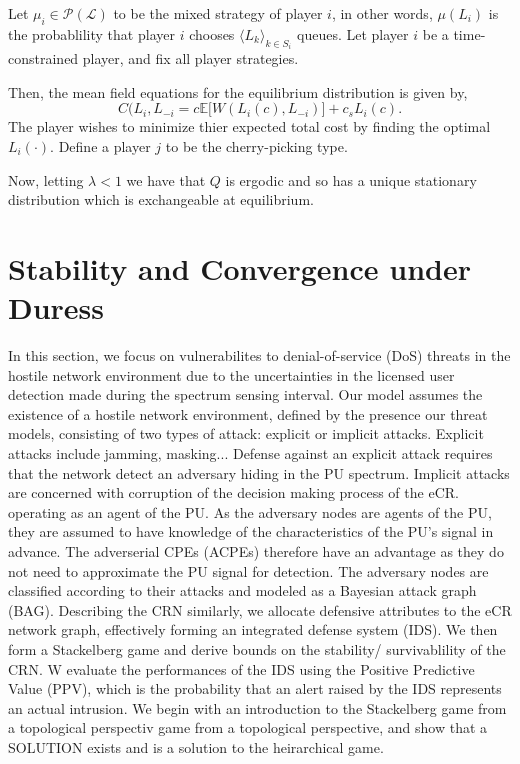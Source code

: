 \documentclass[10pt]{article}
\newcommand{\mcL}{\mathcal{L}}
\newcommand{\mcP}{\mathcal{P}}
\theoremstyle{definition}
\begin{document}
Let $\mu_i \in \mcP(\mcL)$ to be the mixed strategy
of player $i$, in other words, $\mu(L_i)$ is the probablility that player $i$
chooses $\langle L_k \rangle_{k\in S_i}$ queues. Let player $i$ be a time-constrained player, and fix all player strategies.

Then, the mean field equations for the equilibrium distribution is given by,
$$
C(L_i, L_{-i} = c\mathbb{E}\big\lbrack W(L_i(c),L_{-i})\big\rbrack + c_s L_i(c).
$$
The player wishes to minimize thier expected total cost by finding the optimal $L_i(\cdot)$. 
Define a player $j$ to be the cherry-picking type.

Now, letting $\lambda<1$ we have that $Q$ is ergodic and so has a unique
stationary distribution which is exchangeable at equilibrium.

\section{Stability and Convergence under Duress}

In this section, we focus on vulnerabilites to denial-of-service (DoS) threats in the hostile network environment due to the uncertainties in the licensed user detection made during the spectrum sensing interval.
Our model assumes the existence of a hostile network environment, defined by the
presence our threat models, consisting of two types of attack: explicit or
implicit attacks. Explicit attacks include jamming, masking... Defense against
an explicit attack requires that the network detect an adversary hiding in the
PU spectrum. Implicit attacks are concerned with corruption of the decision
making process of the eCR. 
operating as an agent of the PU. As the adversary nodes are agents of the PU,
they are assumed to have knowledge of the characteristics of the PU's signal in
advance. The adverserial CPEs (ACPEs) therefore have an advantage as they do not
need to approximate the PU signal for detection. The adversary nodes are
classified according to their attacks and modeled as a Bayesian attack graph
(BAG). Describing the CRN similarly, we allocate defensive attributes to the eCR network graph, effectively forming an integrated defense system (IDS). We then form a Stackelberg game and derive bounds on the stability/ survivablility of the CRN.
W evaluate the performances of the IDS using the Positive Predictive Value (PPV), which is the probability that an alert raised by the IDS represents an actual intrusion. 
We begin with an introduction to the Stackelberg game from a topological
perspectiv game from a topological perspective, and show that a SOLUTION exists
and is a solution to the heirarchical game.
\end{document}
